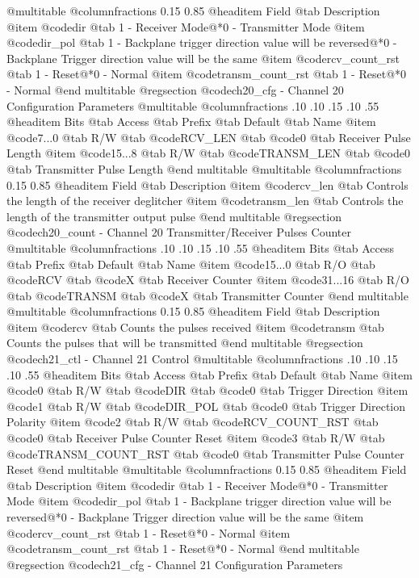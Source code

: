 @multitable @columnfractions 0.15 0.85
@headitem Field @tab Description
@item @code{dir} @tab 1 - Receiver Mode@*0 - Transmitter Mode
@item @code{dir_pol} @tab 1 - Backplane trigger direction value will be reversed@*0 - Backplane Trigger direction value will be the same
@item @code{rcv_count_rst} @tab 1 - Reset@*0 - Normal
@item @code{transm_count_rst} @tab 1 - Reset@*0 - Normal
@end multitable
@regsection @code{ch20_cfg} - Channel 20 Configuration Parameters
@multitable @columnfractions .10 .10 .15 .10 .55
@headitem Bits @tab Access @tab Prefix @tab Default @tab Name
@item @code{7...0}
@tab R/W @tab
@code{RCV_LEN}
@tab @code{0} @tab 
Receiver Pulse Length
@item @code{15...8}
@tab R/W @tab
@code{TRANSM_LEN}
@tab @code{0} @tab 
Transmitter Pulse Length
@end multitable
@multitable @columnfractions 0.15 0.85
@headitem Field @tab Description
@item @code{rcv_len} @tab Controls the length of the receiver deglitcher
@item @code{transm_len} @tab Controls the length of the transmitter output pulse
@end multitable
@regsection @code{ch20_count} - Channel 20 Transmitter/Receiver Pulses Counter
@multitable @columnfractions .10 .10 .15 .10 .55
@headitem Bits @tab Access @tab Prefix @tab Default @tab Name
@item @code{15...0}
@tab R/O @tab
@code{RCV}
@tab @code{X} @tab 
Receiver Counter
@item @code{31...16}
@tab R/O @tab
@code{TRANSM}
@tab @code{X} @tab 
Transmitter Counter
@end multitable
@multitable @columnfractions 0.15 0.85
@headitem Field @tab Description
@item @code{rcv} @tab Counts the pulses received
@item @code{transm} @tab Counts the pulses that will be transmitted
@end multitable
@regsection @code{ch21_ctl} - Channel 21 Control
@multitable @columnfractions .10 .10 .15 .10 .55
@headitem Bits @tab Access @tab Prefix @tab Default @tab Name
@item @code{0}
@tab R/W @tab
@code{DIR}
@tab @code{0} @tab 
Trigger Direction
@item @code{1}
@tab R/W @tab
@code{DIR_POL}
@tab @code{0} @tab 
Trigger Direction Polarity
@item @code{2}
@tab R/W @tab
@code{RCV_COUNT_RST}
@tab @code{0} @tab 
Receiver Pulse Counter Reset
@item @code{3}
@tab R/W @tab
@code{TRANSM_COUNT_RST}
@tab @code{0} @tab 
Transmitter Pulse Counter Reset
@end multitable
@multitable @columnfractions 0.15 0.85
@headitem Field @tab Description
@item @code{dir} @tab 1 - Receiver Mode@*0 - Transmitter Mode
@item @code{dir_pol} @tab 1 - Backplane trigger direction value will be reversed@*0 - Backplane Trigger direction value will be the same
@item @code{rcv_count_rst} @tab 1 - Reset@*0 - Normal
@item @code{transm_count_rst} @tab 1 - Reset@*0 - Normal
@end multitable
@regsection @code{ch21_cfg} - Channel 21 Configuration Parameters
